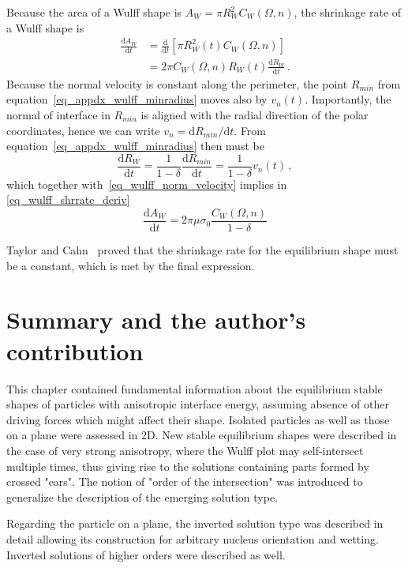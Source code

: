 Because the area of a Wulff shape is $A_W=\pi R_W^2C_W(\Omega,n)$, the shrinkage rate of a Wulff shape is
\begin{equation}\label{eq_wulff_shrrate_deriv}
	\begin{split}
		\frac{\mathrm{d}A_W}{\mathrm{d}t} &= \frac{\mathrm{d}}{\mathrm{d}t}[\pi R_W^2(t)C_W(\Omega,n)]    \\
		&= 2\pi C_W(\Omega,n) R_W(t) \frac{\mathrm{d}R_W}{\mathrm{d}t} \,.
	\end{split}
\end{equation}
Because  the normal velocity is constant along the perimeter, the point $R_{min}$ from equation~\eqref{eq_appdx_wulff_minradius} moves also by $v_n(t)$. Importantly, the normal of interface in $R_{min}$ is aligned with the radial direction of the polar coordinates, hence we can write $v_n=\mathrm{d}R_{min}/\mathrm{d}t$. From equation~\eqref{eq_appdx_wulff_minradius} then must be
\begin{equation}
	\frac{\mathrm{d}R_{W}}{\mathrm{d}t}=\frac{1}{1-\delta}\frac{\mathrm{d}R_{min}}{\mathrm{d}t}=\frac{1}{1-\delta}v_n(t) \,,
\end{equation}
which together with~\ref{eq_wulff_norm_velocity} implies in \ref{eq_wulff_shrrate_deriv}
\begin{equation}
	\frac{\mathrm{d}A_W}{\mathrm{d}t} = 2\pi\mu\sigma_0  \frac{C_W(\Omega,n)}{1-\delta} 
\end{equation}

Taylor and Cahn~\cite{Taylor1998} proved that the shrinkage rate for the equilibrium shape must be a constant, which is met by the final expression.


\section{Summary and the author's contribution}
This chapter contained fundamental information about the equilibrium stable shapes of particles with anisotropic interface energy, assuming absence of other driving forces which might affect their shape. Isolated particles as well as those on a plane were assessed in 2D. New stable equilibrium shapes were described in the case of very strong anisotropy, where the Wulff plot may self-intersect multiple times, thus giving rise to the solutions containing parts formed by crossed "ears". The notion of "order of the intersection" was introduced to generalize the description of the emerging solution type. 

Regarding the particle on a plane, the inverted solution type was described in detail allowing its construction for arbitrary nucleus orientation and wetting. Inverted solutions of higher orders were described as well.

